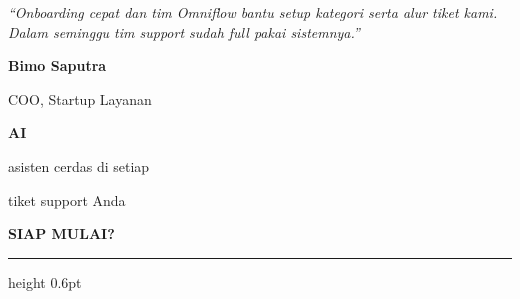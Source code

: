 \documentclass[a4paper]{article}
\newcommand{\sectiontitle}[1]{%
    \vspace{10pt}%
    {\fontsize{13}{16}\selectfont\bfseries\color{BlueDark} #1}\par\vspace{3pt}%
    {\color{BluePrimary}\hrule height 0.6pt}\par\vspace{8pt}%
}
\begin{document}
\noindent
\begin{minipage}[t]{0.485\textwidth}
    \colorbox{BlueBg}{%
        \begin{minipage}{\dimexpr\linewidth-2\fboxsep\relax}
            {\fontsize{9.5}{13}\selectfont\color{TextDark}\textit{``Onboarding cepat dan tim Omniflow bantu setup kategori serta alur tiket kami. Dalam seminggu tim support sudah full pakai sistemnya.''}}\par\vspace{4pt}
            {\fontsize{8.5}{11}\selectfont\bfseries\color{BluePrimary} Bimo Saputra}\par
            {\fontsize{8}{10}\selectfont\color{TextLight} COO, Startup Layanan}
        \end{minipage}}
\end{minipage}%
\hfill
\begin{minipage}[t]{0.485\textwidth}
    \colorbox{BlueBg}{%
        \begin{minipage}{\dimexpr\linewidth-2\fboxsep\relax}
            \begin{center}
                {\fontsize{20}{24}\selectfont\bfseries\color{BluePrimary} AI}\par
                {\fontsize{9.5}{12}\selectfont\color{TextDark} asisten cerdas di setiap}\par
                {\fontsize{9.5}{12}\selectfont\color{TextDark} tiket support Anda}
            \end{center}
        \end{minipage}}
\end{minipage}

\sectiontitle{SIAP MULAI?}
\end{document}
